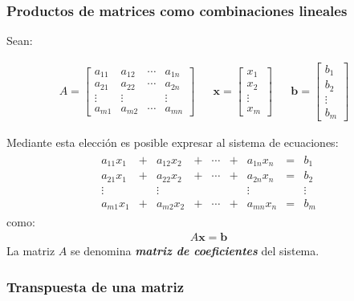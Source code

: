 \documentclass[a4paper,12pt]{article}
\begin{document}
\subsubsection{Productos de matrices como combinaciones lineales}

Sean:

\begin{align*}
  A = \begin{bmatrix}
    a_{11}& a_{12}& \cdots& a_{1n}\\
    a_{21}& a_{22}& \cdots& a_{2n}\\
    \vdots&\vdots &       &\vdots \\
    a_{m1}& a_{m2}& \cdots& a_{mn}
  \end{bmatrix} &
  & \textbf{x} = \begin{bmatrix}
    x_1    \\
    x_2    \\
    \vdots \\
    x_m
  \end{bmatrix} &
  & \textbf{b} = \begin{bmatrix}
    b_1    \\
    b_2    \\
    \vdots \\
    b_m
  \end{bmatrix} &
\end{align*}

Mediante esta elección es posible expresar al sistema de ecuaciones:
\begin{align*}
  \begin{matrix}
    a_{11}x_1 &+& a_{12}x_2 &+& \cdots &+& a_{1n}x_n &=& b_1     \\
    a_{21}x_1 &+& a_{22}x_2 &+& \cdots &+& a_{2n}x_n &=& b_2     \\
    \vdots    & &\vdots     & &        & &\vdots     & & \vdots\\
    a_{m1}x_1 &+& a_{m2}x_2 &+& \cdots &+& a_{mn}x_n &=& b_m
  \end{matrix}
\end{align*}
como:
\begin{align*}
  A\textbf{x}=\textbf{b}
\end{align*}
La matriz $A$ se denomina \textbf{\emph{matriz de coeficientes}} del sistema.


\subsubsection{Transpuesta de una matriz}
\end{document}
